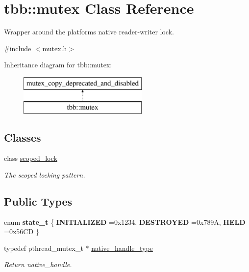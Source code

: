 \hypertarget{classtbb_1_1mutex}{}\section{tbb\+:\+:mutex Class Reference}
\label{classtbb_1_1mutex}


Wrapper around the platform\textquotesingle{}s native reader-\/writer lock.  




{\ttfamily \#include $<$mutex.\+h$>$}

Inheritance diagram for tbb\+:\+:mutex\+:\begin{figure}[H]
\begin{center}
\leavevmode
\includegraphics[height=2.000000cm]{classtbb_1_1mutex}
\end{center}
\end{figure}
\subsection*{Classes}
\begin{DoxyCompactItemize}
\item 
class \hyperlink{classtbb_1_1mutex_1_1scoped__lock}{scoped\+\_\+lock}
\begin{DoxyCompactList}\small\item\em The scoped locking pattern. \end{DoxyCompactList}\end{DoxyCompactItemize}
\subsection*{Public Types}
\begin{DoxyCompactItemize}
\item 
\hypertarget{classtbb_1_1mutex_ad35737cbe356d6814f59abba680ab067}{}enum {\bfseries state\+\_\+t} \{ {\bfseries I\+N\+I\+T\+I\+A\+L\+I\+Z\+E\+D} =0x1234, 
{\bfseries D\+E\+S\+T\+R\+O\+Y\+E\+D} =0x789\+A, 
{\bfseries H\+E\+L\+D} =0x56\+C\+D
 \}\label{classtbb_1_1mutex_ad35737cbe356d6814f59abba680ab067}

\item 
\hypertarget{classtbb_1_1mutex_a0d992511dfc6f47295b10eb7fc0813d4}{}typedef pthread\+\_\+mutex\+\_\+t $\ast$ \hyperlink{classtbb_1_1mutex_a0d992511dfc6f47295b10eb7fc0813d4}{native\+\_\+handle\+\_\+type}\label{classtbb_1_1mutex_a0d992511dfc6f47295b10eb7fc0813d4}

\begin{DoxyCompactList}\small\item\em Return native\+\_\+handle. \end{DoxyCompactList}\end{DoxyCompactItemize}
